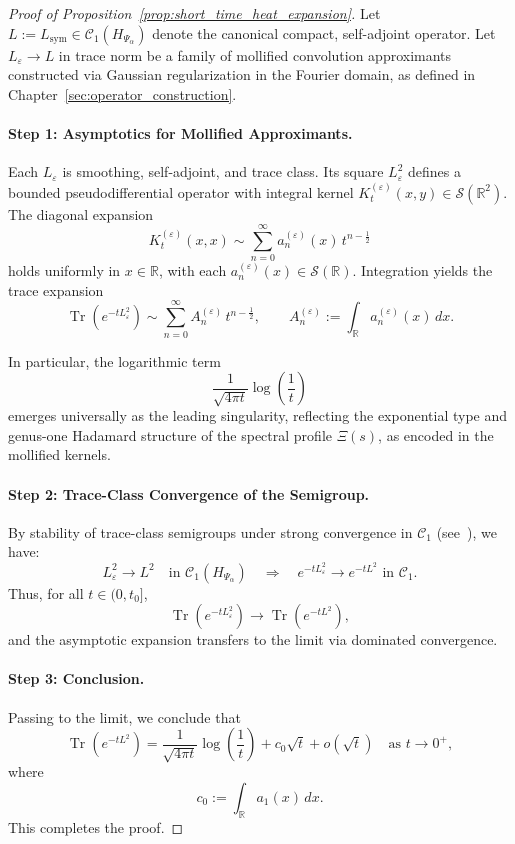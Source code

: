 \begin{proof}[Proof of Proposition~\ref{prop:short_time_heat_expansion}]
Let \( L := L_{\mathrm{sym}} \in \mathcal{C}_1(H_{\Psi_\alpha}) \) denote the canonical compact, self-adjoint operator. Let \( L_\varepsilon \to L \) in trace norm be a family of mollified convolution approximants constructed via Gaussian regularization in the Fourier domain, as defined in Chapter~\ref{sec:operator_construction}.

\paragraph{Step 1: Asymptotics for Mollified Approximants.}
Each \( L_\varepsilon \) is smoothing, self-adjoint, and trace class. Its square \( L_\varepsilon^2 \) defines a bounded pseudodifferential operator with integral kernel \( K^{(\varepsilon)}_t(x,y) \in \mathcal{S}(\mathbb{R}^2) \). The diagonal expansion
\[
K^{(\varepsilon)}_t(x,x) \sim \sum_{n=0}^\infty a_n^{(\varepsilon)}(x)\, t^{n - \frac{1}{2}}
\]
holds uniformly in \( x \in \mathbb{R} \), with each \( a_n^{(\varepsilon)}(x) \in \mathcal{S}(\mathbb{R}) \). Integration yields the trace expansion
\[
\operatorname{Tr}(e^{-t L_\varepsilon^2}) \sim \sum_{n=0}^\infty A_n^{(\varepsilon)}\, t^{n - \frac{1}{2}}, \qquad A_n^{(\varepsilon)} := \int_{\mathbb{R}} a_n^{(\varepsilon)}(x)\, dx.
\]

In particular, the logarithmic term
\[
\frac{1}{\sqrt{4\pi t}} \log\left( \frac{1}{t} \right)
\]
emerges universally as the leading singularity, reflecting the exponential type and genus-one Hadamard structure of the spectral profile \( \Xi(s) \), as encoded in the mollified kernels.

\paragraph{Step 2: Trace-Class Convergence of the Semigroup.}
By stability of trace-class semigroups under strong convergence in \( \mathcal{C}_1 \) (see~\cite[Thm.~3.2]{Simon2005TraceIdeals}), we have:
\[
L_\varepsilon^2 \to L^2 \quad \text{in } \mathcal{C}_1(H_{\Psi_\alpha}) \quad \Longrightarrow \quad e^{-t L_\varepsilon^2} \to e^{-t L^2} \text{ in } \mathcal{C}_1.
\]
Thus, for all \( t \in (0, t_0] \),
\[
\operatorname{Tr}(e^{-t L_\varepsilon^2}) \to \operatorname{Tr}(e^{-t L^2}),
\]
and the asymptotic expansion transfers to the limit via dominated convergence.

\paragraph{Step 3: Conclusion.}
Passing to the limit, we conclude that
\[
\operatorname{Tr}(e^{-t L^2}) = \frac{1}{\sqrt{4\pi t}} \log\left( \frac{1}{t} \right) + c_0 \sqrt{t} + o(\sqrt{t}) \quad \text{as } t \to 0^+,
\]
where
\[
c_0 := \int_{\mathbb{R}} a_1(x) \, dx.
\]
This completes the proof.
\end{proof}

